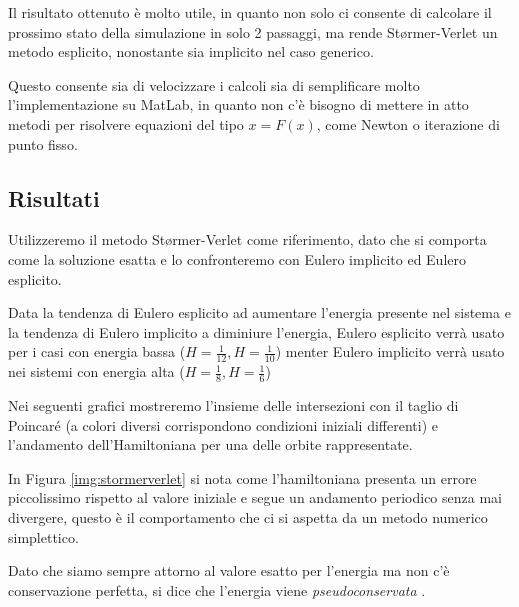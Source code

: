 \documentclass[a4paper]{article}
\numberwithin{equation}{section}
\numberwithin{figure}{section}
\begin{document}
Il risultato ottenuto è molto utile, in quanto non solo ci consente di calcolare il prossimo
stato della simulazione in solo 2 passaggi, ma rende Størmer-Verlet un metodo esplicito, nonostante
sia implicito nel caso generico.

Questo consente sia di velocizzare i calcoli sia di semplificare molto l'implementazione su MatLab, in
quanto non c'è bisogno di mettere in atto metodi per risolvere equazioni del tipo $x = F(x)$, come
Newton o iterazione di punto fisso.

\subsection{Risultati}
Utilizzeremo il metodo Størmer-Verlet come riferimento, dato che si comporta come la soluzione
esatta \cite{hairer} e lo confronteremo con Eulero implicito ed Eulero esplicito.

Data la tendenza di Eulero esplicito ad aumentare l'energia presente nel sistema e la tendenza
di Eulero implicito a diminiure l'energia, Eulero esplicito verrà usato per i casi con energia
bassa ($H=\frac{1}{12}, H=\frac{1}{10}$) menter Eulero implicito verrà usato nei sistemi con
energia alta ($H=\frac{1}{8}, H=\frac{1}{6}$)

Nei seguenti grafici mostreremo l'insieme delle intersezioni con il taglio di Poincaré (a colori
diversi corrispondono condizioni iniziali differenti) e l'andamento dell'Hamiltoniana per una delle
orbite rappresentate.

In Figura \ref{img:stormerverlet} si nota come l'hamiltoniana presenta un errore piccolissimo rispetto
al valore iniziale e segue un andamento periodico senza mai divergere, questo è il comportamento che 
ci si aspetta da un metodo numerico simplettico.

Dato che siamo sempre attorno al valore esatto per l'energia ma non c'è conservazione perfetta, si dice che
l'energia viene \textit{pseudoconservata} .
\end{document}
